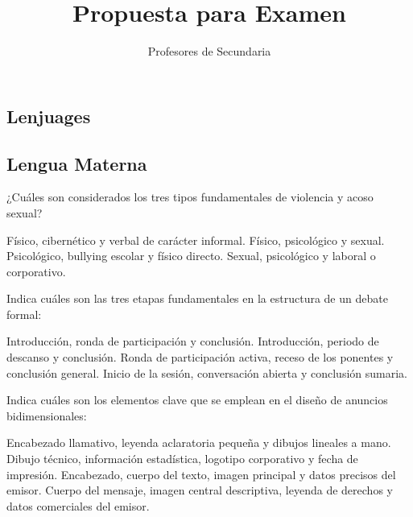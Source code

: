 \documentclass[12pt]{evaluasep}
\title{Propuesta para Examen}
\author{Profesores de Secundaria}
\begin{document}
	\tableofcontents
\vfill

\newpage
\begin{questions}
	\section{Lenjuages}
                \subsection{Lengua Materna}

\question ¿Cuáles son considerados los tres tipos fundamentales de violencia y acoso sexual?
    \begin{choices}
        \choice Físico, cibernético y verbal de carácter informal.
        \CorrectChoice Físico, psicológico y sexual.
        \choice Psicológico, bullying escolar y físico directo.
        \choice Sexual, psicológico y laboral o corporativo.
    \end{choices}
    \vspace{0.3cm}

    \question Indica cuáles son las tres etapas fundamentales en la estructura de un debate formal:
    \begin{choices}
        \CorrectChoice Introducción, ronda de participación y conclusión.
        \choice Introducción, periodo de descanso y conclusión.
        \choice Ronda de participación activa, receso de los ponentes y conclusión general.
        \choice Inicio de la sesión, conversación abierta y conclusión sumaria.
    \end{choices}
    \vspace{0.3cm}

    \question Indica cuáles son los elementos clave que se emplean en el diseño de anuncios bidimensionales:
    \begin{choices}
        \choice Encabezado llamativo, leyenda aclaratoria pequeña y dibujos lineales a mano.
        \choice Dibujo técnico, información estadística, logotipo corporativo y fecha de impresión.
        \CorrectChoice Encabezado, cuerpo del texto, imagen principal y datos precisos del emisor.
        \choice Cuerpo del mensaje, imagen central descriptiva, leyenda de derechos y datos comerciales del emisor.
    \end{choices}
    \vspace{0.3cm}


\end{questions}
\end{document}
